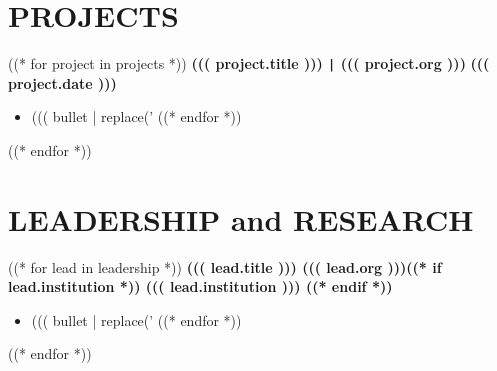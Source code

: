 \documentclass[10pt]{article}
\begin{document}
\vspace{-0.4cm}
\section*{PROJECTS}
((* for project in projects *))
\vspace{-0.1cm}
\noindent
\textbf{((( project.title ))) \texttt{|} ((( project.org )))} \hfill \textbf{((( project.date )))} \\
\vspace{-0.4cm}
\begin{itemize}[leftmargin=0.6cm, itemsep=-0.1cm, topsep=0cm]
((* for bullet in project.bullets *))
    \item ((( bullet | replace('%
((* endfor *))
\end{itemize}
((* endfor *))

\vspace{-0.4cm}
\section*{LEADERSHIP and RESEARCH}
\vspace{-0.1cm}
((* for lead in leadership *))
\noindent
\textbf{((( lead.title ))) \textbar{} ((( lead.org )))((* if lead.institution *)) \textbar{} \textbf{((( lead.institution ))) }((* endif *))} \\
\vspace{-0.4cm}
\begin{itemize}[leftmargin=0.6cm, itemsep=-0.1cm, topsep=0cm]
((* for bullet in lead.bullets *))
    \item ((( bullet | replace('%
((* endfor *))
\end{itemize}
((* endfor *))
\end{document}
